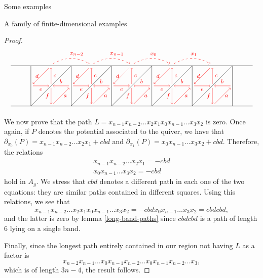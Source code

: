 \begin{chapter}{Some examples}
\begin{section}{A family of finite-dimensional examples}
\begin{proof}
\[
\begin{tikzpicture}[text width=1.5mm, font=\footnotesize]
\draw (-6, 0) -- (6, 0);
\draw (-6, 2) -- (6, 2);
\foreach \x in {-5,-3,...,5}
\draw (\x, 0) -- (\x, 2);
\foreach \x in {-5,-3,...,3}
{
\draw (\x,0) -- (\x+2, 2);
\draw [->, red] (\x+1.9, 1) to node[above] {$b$} (\x+1.1, 1);
\draw[->, red] (\x+1, 0.9) to node[left]{$f$} (\x+1, 0.1);
\draw[->, red] (\x+1.1, 0.1) to node[right]{$a$} (\x+1.9, 0.9);
\draw[->, red] (\x+1, 1.1) to node[right]{$c$} (\x+1, 1.9);
\draw[->, red] (\x+0.9, 1.9) to node[left]{$d$} (\x+0.1, 1.1);
\draw[->, red] (\x+0.1, 1) to node[below]{$e$} (\x+0.9, 1);
}

\draw[->, red, dashed] (-5+1.1, 2.1) to [bend left] node[above]{$x_{n-2}$} (-5+2.9, 2.1);
\draw[->, red, dashed] (-3+1.1, 2.1) to [bend left] node[above]{$x_{n-1}$} (-3+2.9, 2.1);
\draw[->, red, dashed] (-1+1.1, 2.1) to [bend left] node[above]{$x_{0}$} (-1+2.9, 2.1);
\draw[->, red, dashed] (1+1.1, 2.1) to [bend left] node[above]{$x_{1}$} (1+2.9, 2.1);
\end{tikzpicture}
\]

We now prove that the path $L=x_{n-1}x_{n-2}\dots x_2x_1x_{0}x_{n-1}\dots x_3x_2$ is zero. Once again, if $P$ denotes the potential associated to the quiver, we have that $\partial_{x_0}(P)=x_{n-1}x_{n-2}\dots x_2x_1+cbd$ and $\partial_{x_1}(P)=x_{0}x_{n-1}\dots x_3x_2+cbd$. Therefore, the relations
\begin{align*}
x_{n-1}x_{n-2}\dots x_2x_1=-cbd\\
x_{0}x_{n-1}\dots x_3x_2=-cbd
\end{align*}
hold in $A_g$. We stress that $cbd$ denotes a different path in each one of the two equations: they are similar paths contained in different squares. Using this relations, we see that $$ x_{n-1}x_{n-2}\dots x_2x_1x_{0}x_{n-1}\dots x_3x_2=-cbdx_{0}x_{n-1}\dots x_3x_2=cbdcbd,$$ and the latter is zero by lemma \ref{long-band-paths} since $cbdcbd$ is a path of length 6 lying on a single band. 

Finally, since the longest path entirely contained in our region not having $L$ as a factor is
$$x_{n-2}x_{n-1}\dots x_0x_{n-1}x_{n-2}\dots x_0x_{n-1}x_{n-2}\dots x_3,$$
which is of length $3n-4$, the result follows.
\end{proof}
\end{section}
\end{chapter}